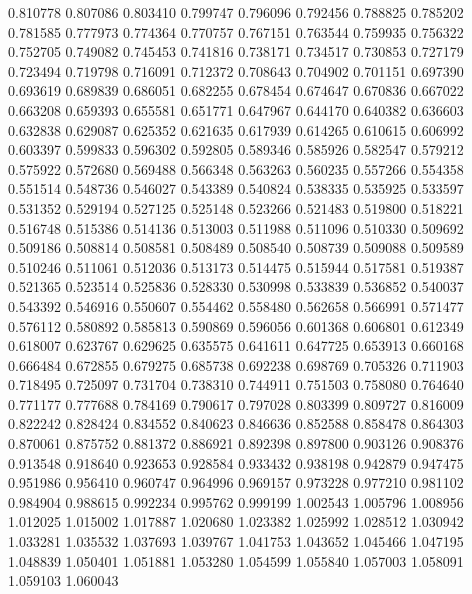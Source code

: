 0.810778
0.807086
0.803410
0.799747
0.796096
0.792456
0.788825
0.785202
0.781585
0.777973
0.774364
0.770757
0.767151
0.763544
0.759935
0.756322
0.752705
0.749082
0.745453
0.741816
0.738171
0.734517
0.730853
0.727179
0.723494
0.719798
0.716091
0.712372
0.708643
0.704902
0.701151
0.697390
0.693619
0.689839
0.686051
0.682255
0.678454
0.674647
0.670836
0.667022
0.663208
0.659393
0.655581
0.651771
0.647967
0.644170
0.640382
0.636603
0.632838
0.629087
0.625352
0.621635
0.617939
0.614265
0.610615
0.606992
0.603397
0.599833
0.596302
0.592805
0.589346
0.585926
0.582547
0.579212
0.575922
0.572680
0.569488
0.566348
0.563263
0.560235
0.557266
0.554358
0.551514
0.548736
0.546027
0.543389
0.540824
0.538335
0.535925
0.533597
0.531352
0.529194
0.527125
0.525148
0.523266
0.521483
0.519800
0.518221
0.516748
0.515386
0.514136
0.513003
0.511988
0.511096
0.510330
0.509692
0.509186
0.508814
0.508581
0.508489
0.508540
0.508739
0.509088
0.509589
0.510246
0.511061
0.512036
0.513173
0.514475
0.515944
0.517581
0.519387
0.521365
0.523514
0.525836
0.528330
0.530998
0.533839
0.536852
0.540037
0.543392
0.546916
0.550607
0.554462
0.558480
0.562658
0.566991
0.571477
0.576112
0.580892
0.585813
0.590869
0.596056
0.601368
0.606801
0.612349
0.618007
0.623767
0.629625
0.635575
0.641611
0.647725
0.653913
0.660168
0.666484
0.672855
0.679275
0.685738
0.692238
0.698769
0.705326
0.711903
0.718495
0.725097
0.731704
0.738310
0.744911
0.751503
0.758080
0.764640
0.771177
0.777688
0.784169
0.790617
0.797028
0.803399
0.809727
0.816009
0.822242
0.828424
0.834552
0.840623
0.846636
0.852588
0.858478
0.864303
0.870061
0.875752
0.881372
0.886921
0.892398
0.897800
0.903126
0.908376
0.913548
0.918640
0.923653
0.928584
0.933432
0.938198
0.942879
0.947475
0.951986
0.956410
0.960747
0.964996
0.969157
0.973228
0.977210
0.981102
0.984904
0.988615
0.992234
0.995762
0.999199
1.002543
1.005796
1.008956
1.012025
1.015002
1.017887
1.020680
1.023382
1.025992
1.028512
1.030942
1.033281
1.035532
1.037693
1.039767
1.041753
1.043652
1.045466
1.047195
1.048839
1.050401
1.051881
1.053280
1.054599
1.055840
1.057003
1.058091
1.059103
1.060043
